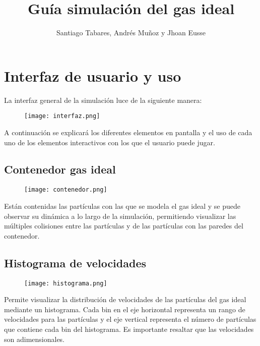 \documentclass[11pt]{article}
\title{Guía simulación del gas ideal}
\author{Santiago Tabares, Andrés Muñoz y Jhoan Eusse}
\date{}
\begin{document}
 
 




\maketitle






\section{Interfaz de usuario y  uso}

La interfaz general de la simulación luce de la siguiente manera: 

\begin{figure}[H]
\centerline{\texttt{[image: interfaz.png]}}
\end{figure}

A continuación se explicará los diferentes elementos en pantalla y el uso de cada uno de los elementos interactivos con los que el usuario puede jugar.

\subsection{Contenedor gas ideal}
\begin{figure}[H]
\centerline{\texttt{[image: contenedor.png]}}
\end{figure}

Están contenidas las partículas con las que se modela el gas ideal y se puede observar su dinámica a lo largo de la simulación, permitiendo visualizar las múltiples colisiones entre las partículas y  de las partículas con las paredes del contenedor. 

\subsection{Histograma de velocidades}
\begin{figure}[H]
\centerline{\texttt{[image: histograma.png]}}
\end{figure}

Permite visualizar la distribución de velocidades de las partículas del gas ideal mediante un histograma. Cada bin en el eje horizontal representa un rango de velocidades para las partículas y el eje vertical representa el número de partículas que contiene cada bin del histograma. Es importante resaltar que las velocidades son adimensionales.
\end{document}
